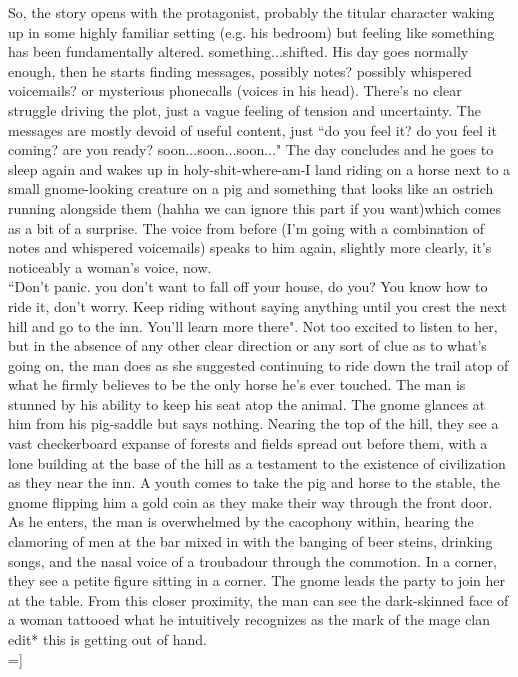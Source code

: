 So, the story opens with the protagonist, probably the titular character
waking up in some highly familiar setting (e.g. his bedroom)
but feeling like something has been fundamentally altered. something...shifted.
His day goes normally enough, then he starts finding messages, possibly notes?
possibly whispered voicemails? or mysterious phonecalls \A(voices in his
head). \E There's no clear struggle driving the plot, just a vague feeling of 
tension and uncertainty. The messages are mostly devoid of useful content, 
just ``do you feel it? do you feel it coming? are you ready? soon...soon...soon..."
The day concludes and he goes to sleep again and wakes up in holy-shit-where-am-I 
land riding on a horse next to a small gnome-looking creature on a pig and 
something that looks like an ostrich running alongside them \A(hahha we can
ignore this part if you want)\E which comes as a bit of a surprise.
The voice from before (I'm going with a combination of notes and 
whispered voicemails) speaks to him again, slightly more clearly, 
it's noticeably a woman's voice, now. \\
``Don't panic. you don't want to fall off your house, do you? You know how to 
ride it, don't worry. Keep riding without saying anything until you crest the 
next hill and go to the inn. You'll learn more there". Not too excited to listen 
to her, but in the absence of any other clear direction or any sort of clue as 
to what's going on, the man does as she suggested
continuing to ride down the trail atop of what he firmly believes to be the only 
horse he's ever touched. The man is stunned by his ability to keep his seat atop 
the animal. The gnome glances at him from his pig-saddle but says nothing. Nearing 
the top of the hill, they see a vast checkerboard expanse of forests and fields 
spread out before them, with a lone building at the base of the hill as a 
testament to the existence of civilization as they near the inn. A youth comes to 
take the pig and horse to the stable, the gnome flipping him a gold coin as 
they make their way through the front door. As he enters, the man is overwhelmed 
by the cacophony within, hearing the clamoring of men at the bar mixed in with 
the banging of beer steins, drinking songs, and the nasal voice of a troubadour
through the commotion. In a corner, they see a petite figure sitting in a
corner. The gnome leads the party to join her at the table.
From this closer proximity, the man can see the dark-skinned face of a woman 
tattooed what he intuitively recognizes as the mark of the mage clan \\
edit* this is getting out of hand. \\

=]
